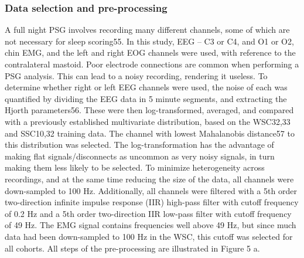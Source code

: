 \subsubsection{Data selection and pre-processing}
A full night PSG involves recording many different channels, some of which are not necessary for sleep scoring55. In this study, EEG – C3 or C4, and O1 or O2, chin EMG, and the left and right EOG channels were used, with reference to the contralateral mastoid. Poor electrode connections are common when performing a PSG analysis. This can lead to a noisy recording, rendering it useless. To determine whether right or left EEG channels were used, the noise of each was quantified by dividing the EEG data in 5 minute segments, and extracting the Hjorth parameters56. These were then log-transformed, averaged, and compared with a previously established multivariate distribution, based on the WSC32,33 and SSC10,32 training data. The channel with lowest Mahalanobis distance57 to this distribution was selected. The log-transformation has the advantage of making flat signals/disconnects as uncommon as very noisy signals, in turn making them less likely to be selected. To minimize heterogeneity across recordings, and at the same time reducing the size of the data, all channels were down-sampled to 100 Hz. Additionally, all channels were filtered with a 5th order two-direction infinite impulse response (IIR) high-pass filter with cutoff frequency of 0.2 Hz and a 5th order two-direction IIR low-pass filter with cutoff frequency of 49 Hz. The EMG signal contains frequencies well above 49 Hz, but since much data had been down-sampled to 100 Hz in the WSC, this cutoff was selected for all cohorts. All steps of the pre-processing are illustrated in Figure 5 a.

